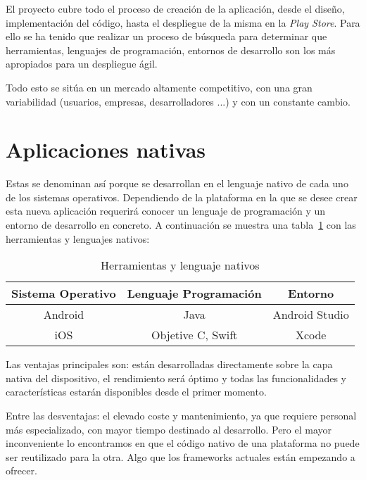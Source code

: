 
El proyecto cubre todo el proceso de creación de la aplicación, desde el diseño, implementación del código, hasta el despliegue de la misma en la \emph{Play Store}. Para ello se ha tenido que realizar un proceso de búsqueda para determinar que herramientas, lenguajes de programación, entornos de desarrollo son los más apropiados para un despliegue ágil.

Todo esto se sitúa en un mercado altamente competitivo, con una gran variabilidad (usuarios, empresas, desarrolladores ...) y con un constante cambio. 

\section{Aplicaciones nativas}
Estas se denominan así porque se desarrollan en el lenguaje nativo de cada uno de los sistemas operativos. Dependiendo de la plataforma en la que se desee crear esta nueva aplicación requerirá conocer un lenguaje de programación y un entorno de desarrollo en concreto. A continuación se muestra una tabla~\ref{table:nativos} con las herramientas y lenguajes nativos:

\begin{table}[H]
	\begin{center}
		\begin{tabular}{ccc}
			\hline
			Sistema Operativo                        & Lenguaje Programación & Entorno \\ \hline
			Android				    & Java      & Android Studio					\\
			iOS			    & Objetive C, Swift       & Xcode						\\ \hline
		\end{tabular}
		\caption{Herramientas y lenguaje nativos}
		\label{table:nativos}
	\end{center}
\end{table}

Las ventajas principales son: están desarrolladas directamente sobre la capa nativa del dispositivo, el rendimiento será óptimo y todas las funcionalidades y características estarán disponibles desde el primer momento.

Entre las desventajas: el elevado coste y mantenimiento, ya que requiere personal más especializado, con mayor tiempo destinado al desarrollo. Pero el mayor inconveniente lo encontramos en que el código nativo de una plataforma no puede ser reutilizado para la otra. Algo que los frameworks actuales están empezando a ofrecer.

